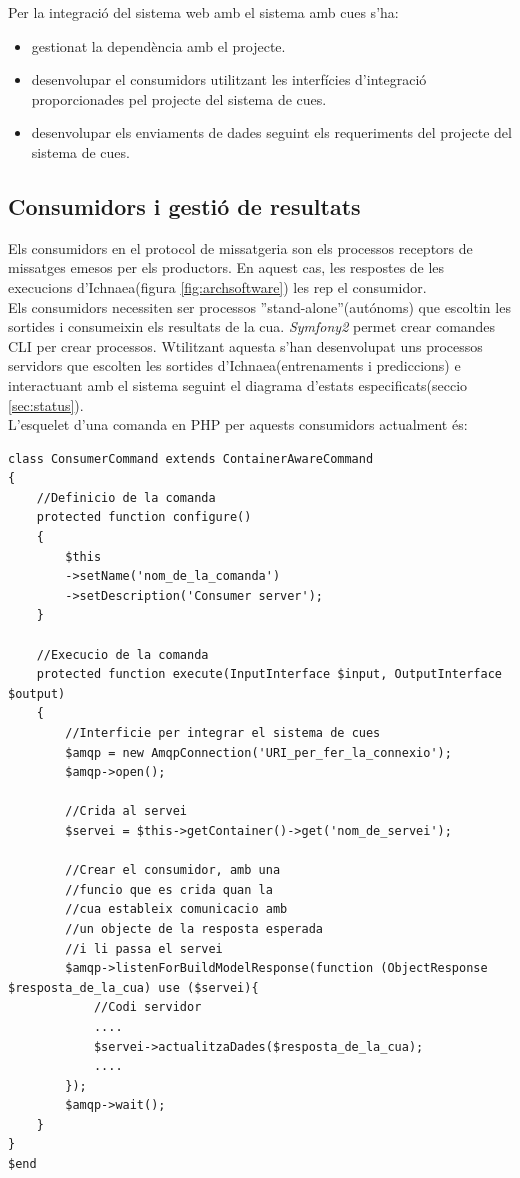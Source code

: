 Per la integració del sistema web amb el sistema amb cues s'ha:
\begin{itemize}
\item gestionat la dependència amb el projecte.
\item desenvolupar el consumidors utilitzant les interfícies d'integració proporcionades pel projecte del sistema de cues.
\item desenvolupar els enviaments de dades seguint els requeriments del projecte del sistema de cues.
\end{itemize}

\subsection{Consumidors i gesti\'{o} de resultats}
Els consumidors en el protocol de missatgeria son els processos receptors de missatges emesos per els productors. En aquest cas, les respostes de les execucions d'Ichnaea(figura \ref{fig:archsoftware}) les rep el consumidor.\\

Els consumidors necessiten ser processos ''stand-alone''(aut\'{o}noms) que escoltin les sortides i consumeixin els resultats de la cua. \textit{Symfony2} permet crear comandes CLI per crear processos. Wtilitzant aquesta s'han desenvolupat uns processos servidors que escolten les sortides d'Ichnaea(entrenaments i prediccions) e interactuant amb el sistema seguint el diagrama d'estats especificats(seccio \ref{sec:status}).\\

L'esquelet d'una comanda en PHP per aquests consumidors actualment \'{e}s:
\begin{lstlisting}
class ConsumerCommand extends ContainerAwareCommand
{
	//Definicio de la comanda
	protected function configure()
	{
		$this
		->setName('nom_de_la_comanda')
		->setDescription('Consumer server');
	}
	
	//Execucio de la comanda
	protected function execute(InputInterface $input, OutputInterface $output)
	{
		//Interficie per integrar el sistema de cues
		$amqp = new AmqpConnection('URI_per_fer_la_connexio');
		$amqp->open();
		
		//Crida al servei
		$servei = $this->getContainer()->get('nom_de_servei');
		
		//Crear el consumidor, amb una 
		//funcio que es crida quan la 
		//cua estableix comunicacio amb 
		//un objecte de la resposta esperada 
		//i li passa el servei 
		$amqp->listenForBuildModelResponse(function (ObjectResponse $resposta_de_la_cua) use ($servei){
		 	//Codi servidor
		 	....
			$servei->actualitzaDades($resposta_de_la_cua);
			....
		});
		$amqp->wait();
	}
}
$end
\end{lstlisting}


